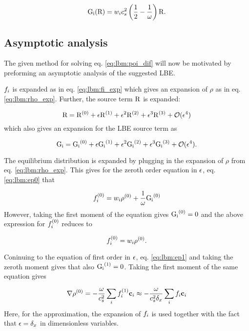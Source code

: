 \begin{equation}\label{eq:lbm:gi}
\mathrm{G_i}(\mathrm{R}) = w_ic_s^2 \left( \frac{1}{2} - \frac{1}{\omega} \right)\mathrm{R}.
\end{equation}

\subsection{Asymptotic analysis}\label{sec:lbm:asym_pe}
The given method for solving eq. \eqref{eq:lbm:poi_dif} will now be
motivated by preforming an asymptotic analysis of the suggested LBE.

$f_i$ is expanded as in eq. \eqref{eq:lbm:fi_exp} which gives an
expansion of $\rho$ as in eq. \eqref{eq:lbm:rho_exp}. Further, 
the source term $\mathrm{R}$ is expanded: 

\begin{equation}\label{eq:lbm:R_exp}
\mathrm{R} = \mathrm{\mathrm{R}}^{(0)} + \epsilon\mathrm{\mathrm{R}}^{(1)} + \epsilon^2\mathrm{\mathrm{R}}^{(2)} + \epsilon^3\mathrm{\mathrm{R}}^{(3)} + \mathcal{O}(\epsilon^4)
\end{equation} 
which also gives an expansion for the LBE source term as

\begin{equation}\label{eq:lbm:G_exp}
\mathrm{G_i} = \mathrm{G_i}^{(0)} + \epsilon\mathrm{G_i}^{(1)} + \epsilon^2\mathrm{G_i}^{(2)} + \epsilon^3\mathrm{G_i}^{(3)} + \mathcal{O}(\epsilon^4).
\end{equation} 

The equilibrium distribution is expanded by plugging in the expansion
of $\rho$ from eq. \eqref{eq:lbm:rho_exp}. This gives for the zeroth
order equation in $\epsilon$, eq. \eqref{eq:lbm:ep0} that

\begin{equation}
f_i^{(0)} = w_i\rho^{(0)} + \frac{1}{\omega}\mathrm{G_i}^{(0)}
\end{equation}
However, taking the first moment of the equation gives $\mathrm{G_i}^{(0)} = 0$
and the above expression for $f_i^{(0)}$ reduces to

\begin{equation}
f_i^{(0)} = w_i\rho^{(0)}.
\end{equation}

Coninuing to the equation of first order in $\epsilon$,
eq. \eqref{eq:lbm:ep1} and taking the zeroth moment gives that also
$\mathrm{G_i}^{(1)} = 0$. Taking the first moment of the same equation  gives

\begin{equation}
\nabla \rho^{(0)} = - \frac{\omega}{c_s^2} \sum_i f_i^{(1)} \mathbf{c}_i \approx -
\frac{\omega}{c_s^2 \delta_x} \sum_i f_i \mathbf{c}_i
\end{equation}
Here, for the approximation, the expansion of $f_i$ is used together
with the fact that $\epsilon = \delta_x$ in dimensionless variables.

